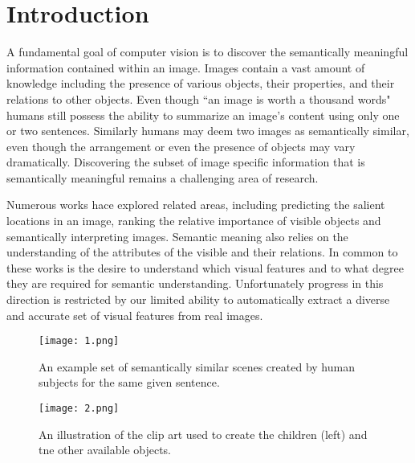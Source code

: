 \documentclass[10pt,twocolumn,letterpaper]{article}
\begin{document}
\section{Introduction}
A fundamental goal of computer vision is to discover the semantically meaningful information contained within an image\cite{Privitera2000Algorithms}. Images contain a vast amount of knowledge including the presence of various objects\cite{Berg2012Understanding}, their properties, and their relations to other objects. Even though ``an image is worth a thousand words" humans still possess the ability to summarize an image's content using only one or two sentences. Similarly humans may deem two images as semantically similar, even though the arrangement or even the presence of objects may vary dramatically. Discovering the subset of image specific information that is semantically meaningful remains a challenging area of research.
\par
Numerous works hace explored related areas, including predicting the salient locations in an image, ranking the relative importance of visible objects and semantically interpreting images. Semantic meaning also relies on the understanding of the attributes of the visible and their relations. In common to these works is the desire to understand which visual features and to what degree they are required for semantic understanding. Unfortunately progress in this direction is restricted by our limited ability to automatically extract a diverse and accurate set of visual features from real images.
\begin{figure}
\begin{center}
  \texttt{[image: 1.png]}\\
  \caption{An example set of semantically similar scenes created by human subjects for the same given sentence.}\label{1}
\end{center}
\end{figure}
\par 
\begin{figure*}
\begin{center}
  \texttt{[image: 2.png]}\\
  \caption{An illustration of the clip art used to create the children (left) and tne other available objects.}\label{2}
\end{center}
\end{figure*}
\par
\end{document}
